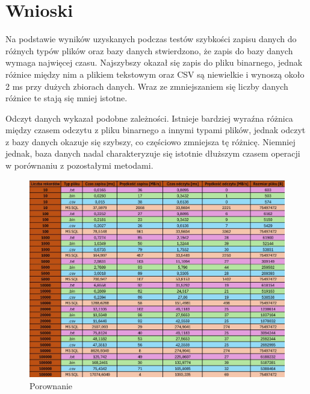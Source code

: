 \documentclass{report}
\begin{document}
\section{Wnioski}

Na podstawie wyników uzyskanych podczas testów szybkości zapisu danych do różnych typów plików oraz bazy danych stwierdzono, że zapis do bazy danych wymaga najwięcej czasu. Najszybszy okazał się zapis do pliku binarnego, jednak różnice między nim a plikiem tekstowym oraz CSV są niewielkie i wynoszą około 2 ms przy dużych zbiorach danych. Wraz ze zmniejszaniem się liczby danych różnice te stają się mniej istotne.

Odczyt danych wykazał podobne zależności. Istnieje bardziej wyraźna różnica między czasem odczytu z pliku binarnego a innymi typami plików, jednak odczyt z bazy danych okazuje się szybszy, co częściowo zmniejsza tę różnicę. Niemniej jednak, baza danych nadal charakteryzuje się istotnie dłuższym czasem operacji w porównaniu z pozostałymi metodami.

\begin{figure}[H]
\centering
\includegraphics[width=15cm]{img/tabela-porwn.jpg}
\caption{Porownanie}
\end{figure}
\end{document}
